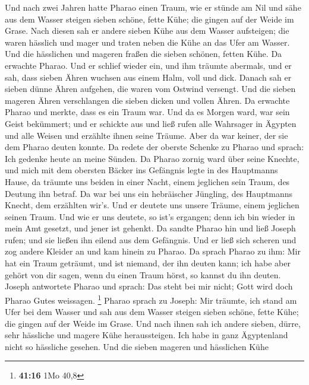  Und nach zwei Jahren hatte Pharao einen Traum, wie er
stünde am Nil  und sähe aus dem Wasser steigen sieben
schöne, fette Kühe; die gingen auf der Weide im Grase. 
Nach diesen sah er andere sieben Kühe aus dem Wasser aufsteigen; die
waren hässlich und mager und traten neben die Kühe an das Ufer am
Wasser.  Und die hässlichen und mageren fraßen die sieben
schönen, fetten Kühe. Da erwachte Pharao.  Und er schlief
wieder ein, und ihm träumte abermals, und er sah, dass sieben Ähren
wuchsen aus einem Halm, voll und dick.  Danach sah er
sieben dünne Ähren aufgehen, die waren vom Ostwind versengt.
 Und die sieben mageren Ähren verschlangen die sieben
dicken und vollen Ähren. Da erwachte Pharao und merkte, dass es ein
Traum war.  Und da es Morgen ward, war sein Geist
bekümmert; und er schickte aus und ließ rufen alle Wahrsager in Ägypten
und alle Weisen und erzählte ihnen seine Träume. Aber da war keiner, der
sie dem Pharao deuten konnte.  Da redete der oberste
Schenke zu Pharao und sprach: Ich gedenke heute an meine Sünden.
 Da Pharao zornig ward über seine Knechte, und mich mit
dem obersten Bäcker ins Gefängnis legte in des Hauptmanns Hause,
 da träumte uns beiden in einer Nacht, einem jeglichen
sein Traum, des Deutung ihn betraf.  Da war bei uns ein
hebräischer Jüngling, des Hauptmanns Knecht, dem erzählten wir's. Und er
deutete uns unsere Träume, einem jeglichen seinen Traum. 
Und wie er uns deutete, so ist's ergangen; denn ich bin wieder in mein
Amt gesetzt, und jener ist gehenkt.  Da sandte Pharao hin
und ließ Joseph rufen; und sie ließen ihn eilend aus dem Gefängnis. Und
er ließ sich scheren und zog andere Kleider an und kam hinein zu Pharao.
 Da sprach Pharao zu ihm: Mir hat ein Traum geträumt, und
ist niemand, der ihn deuten kann; ich habe aber gehört von dir sagen,
wenn du einen Traum hörst, so kannst du ihn deuten. 
Joseph antwortete Pharao und sprach: Das steht bei mir nicht; Gott wird
doch Pharao Gutes weissagen. \footnote{\textbf{41:16} 1Mo 40,8}
 Pharao sprach zu Joseph: Mir träumte, ich stand am Ufer
bei dem Wasser  und sah aus dem Wasser steigen sieben
schöne, fette Kühe; die gingen auf der Weide im Grase. 
Und nach ihnen sah ich andere sieben, dürre, sehr hässliche und magere
Kühe heraussteigen. Ich habe in ganz Ägyptenland nicht so hässliche
gesehen.  Und die sieben mageren und hässlichen Kühe
